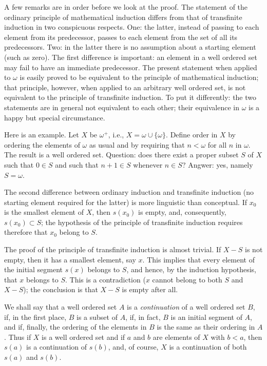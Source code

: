A few remarks are in order before we look at the proof. The statement of the ordinary principle of mathematical induction differs from that of transfinite induction in two conspicuous respects. One: the latter, instead of passing to each element from its predecessor, passes to each element from the set of all its predecessors. Two: in the latter there is no assumption about a starting element (such as zero). The first difference is important: an element in a well ordered set may fail to have an immediate predecessor. The present statement when applied to $\omega$ is easily proved to be equivalent to the principle of mathematical induction; that principle, however, when applied to an arbitrary well ordered set, is not equivalent to the principle of transfinite induction. To put it differently: the two statements are in general not equivalent to each other; their equivalence in $\omega$ is a happy but special circumstance. 

Here is an example. Let $X$ be $\omega^{+}$, i.e., $X = \omega \cup \{ \omega \}$. Define order in $X$ by ordering the elements of $\omega$ as usual and by requiring that $n < \omega$ for all $n$ in $\omega$. The result is a well ordered set. Question: does there exist a proper subset $S$ of $X$ such that $0 \in S$ and such that $n + 1 \in  S$ whenever $n \in S$? Angwer: yes, namely $S = \omega$. 

The second difference between ordinary induction and transfinite induction (no starting element required for the latter) is more linguistic than conceptual. If $x_{0}$ is the smallest element of $X$, then $s(x_{0})$ is empty, and, consequently, $s(x_{0}) \subset S$; the hypothesis of the principle of transfinite induction requires therefore that $x_{0}$ belong to $S$.

The proof of the principle of transfinite induction is almost trivial. If $X - S$ is not empty, then it has a smallest element, say $x$. This implies that every element of the initial segment $s(x)$ belongs to $S$, and hence, by the induction hypothesis, that $x$ belongs to $S$. This is a contradiction ($x$ cannot belong to both $S$ and $X - S$); the conclusion is that $X - S$ is empty after all. 

We shall say that a well ordered set $A$ is a \textit{continuation} of a well ordered set $B$, if, in the first place, $B$ is a subset of $A$, if, in fact, $B$ is an initial segment of $A$, and if, finally, the ordering of the elements in $B$ is the same as their ordering in $A$. Thus if $X$ is a well ordered set and if $a$ and $b$ are elements of $X$ with $b < a$, then $s(a)$ is a continuation of $s(b)$, and, of course, $X$ is a continuation of both $s(a)$ and $s(b)$. 

